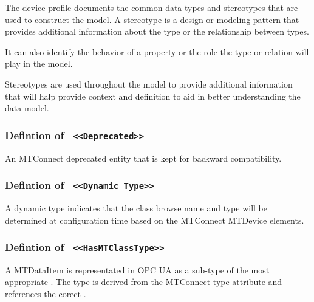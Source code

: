 \FloatBarrier


The device profile documents the common data types and stereotypes that are 
used to construct the model. A stereotype is a design or modeling pattern that 
provides additional information about the type or the relationship between types. 

It can also identify the behavior of a property or the role the type or relation
will play in the model. 

Stereotypes are used throughout the model to provide additional information that 
will halp provide context and definition to aid in better understanding the
data model.

\subsubsection{Defintion of \texttt{ <<Deprecated>>}}
  \label{type:Deprecated}

\FloatBarrier

An MTConnect deprecated entity that is kept for backward compatibility.

\FloatBarrier
\subsubsection{Defintion of \texttt{ <<Dynamic Type>>}}
  \label{type:Dynamic Type}

\FloatBarrier

A dynamic type indicates that the class browse name and type will be 
determined at configuration time based on the MTConnect \gls{MTDevice}
elements.

\FloatBarrier
\subsubsection{Defintion of \texttt{ <<HasMTClassType>>}}
  \label{type:HasMTClassType}

\FloatBarrier

A \gls{MTDataItem} is representated in OPC UA as a sub-type of the most appropriate . 
The type is derived from the MTConnect \gls{type} attribute and references the corect .

